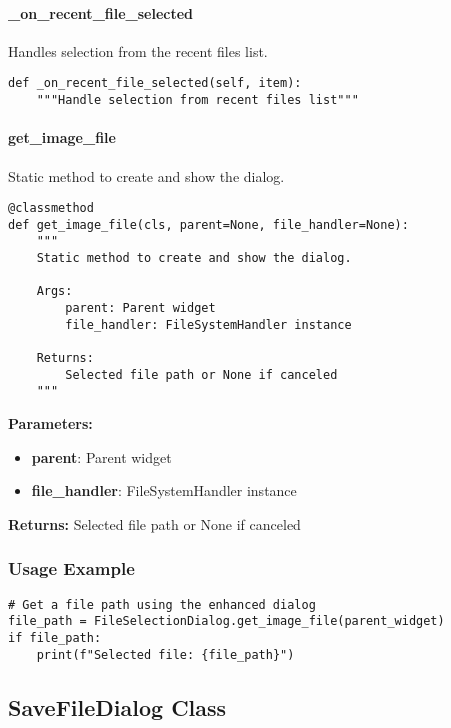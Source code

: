 \paragraph{\_on\_recent\_file\_selected}

Handles selection from the recent files list.

\begin{verbatim}
def _on_recent_file_selected(self, item):
    """Handle selection from recent files list"""
\end{verbatim}

\paragraph{get\_image\_file}

Static method to create and show the dialog.

\begin{verbatim}
@classmethod
def get_image_file(cls, parent=None, file_handler=None):
    """
    Static method to create and show the dialog.
    
    Args:
        parent: Parent widget
        file_handler: FileSystemHandler instance
        
    Returns:
        Selected file path or None if canceled
    """
\end{verbatim}

\textbf{Parameters:}
\begin{itemize}
    \item \textbf{parent}: Parent widget
    \item \textbf{file\_handler}: FileSystemHandler instance
\end{itemize}

\textbf{Returns:} Selected file path or None if canceled

\subsubsection{Usage Example}

\begin{verbatim}
# Get a file path using the enhanced dialog
file_path = FileSelectionDialog.get_image_file(parent_widget)
if file_path:
    print(f"Selected file: {file_path}")
\end{verbatim}

\subsection{SaveFileDialog Class}

